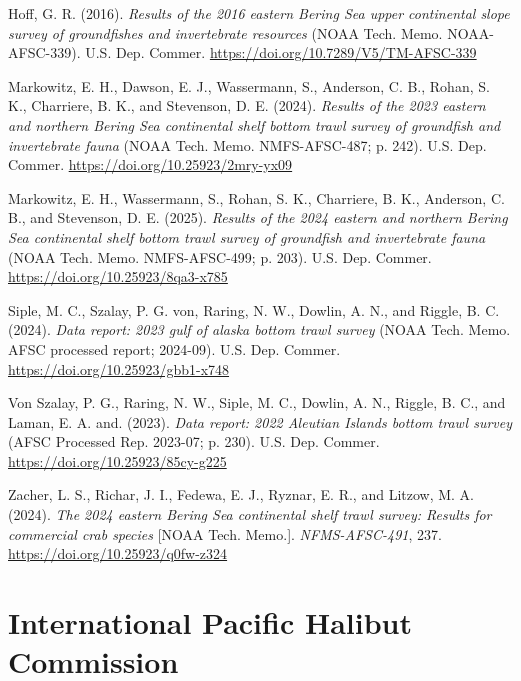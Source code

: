 \documentclass[
  letterpaper,
  oneside,
  open=any]{scrbook}
\newlength{\cslhangindent}
\newenvironment{CSLReferences}[2] %
 {\begin{list}{}{%
  \setlength{\itemindent}{0pt}
  \setlength{\leftmargin}{0pt}
  \setlength{\parsep}{0pt}
  \ifodd #1
   \setlength{\leftmargin}{\cslhangindent}
   \setlength{\itemindent}{-1\cslhangindent}
  \fi
  \setlength{\itemsep}{#2\baselineskip}}}
 {\end{list}}
\begin{document}
\label{refs}
\begin{CSLReferences}{1}{0}
Hoff, G. R. (2016). \emph{Results of the 2016 eastern {Bering Sea} upper
continental slope survey of groundfishes and invertebrate resources}
(NOAA Tech. Memo. NOAA-AFSC-339). {U.S. Dep. Commer.}
\url{https://doi.org/10.7289/V5/TM-AFSC-339}

Markowitz, E. H., Dawson, E. J., Wassermann, S., Anderson, C. B., Rohan,
S. K., Charriere, B. K., and Stevenson, D. E. (2024). \emph{Results of
the 2023 eastern and northern {Bering Sea} continental shelf bottom
trawl survey of groundfish and invertebrate fauna} (NOAA Tech. Memo.
NMFS-AFSC-487; p. 242). {U.S. Dep. Commer.}
\url{https://doi.org/10.25923/2mry-yx09}

Markowitz, E. H., Wassermann, S., Rohan, S. K., Charriere, B. K.,
Anderson, C. B., and Stevenson, D. E. (2025). \emph{Results of the 2024
eastern and northern {Bering Sea} continental shelf bottom trawl survey
of groundfish and invertebrate fauna} (NOAA Tech. Memo. NMFS-AFSC-499;
p. 203). {U.S. Dep. Commer.} \url{https://doi.org/10.25923/8qa3-x785}

Siple, M. C., Szalay, P. G. von, Raring, N. W., Dowlin, A. N., and
Riggle, B. C. (2024). \emph{Data report: 2023 gulf of alaska bottom
trawl survey} (NOAA Tech. Memo. AFSC processed report; 2024-09). {U.S.
Dep. Commer.} \url{https://doi.org/10.25923/gbb1-x748}

Von Szalay, P. G., Raring, N. W., Siple, M. C., Dowlin, A. N., Riggle,
B. C., and Laman, E. A. and. (2023). \emph{Data report: 2022 {Aleutian
Islands} bottom trawl survey} (AFSC Processed Rep. 2023-07; p. 230).
{U.S. Dep. Commer.} \url{https://doi.org/10.25923/85cy-g225}

Zacher, L. S., Richar, J. I., Fedewa, E. J., Ryznar, E. R., and Litzow,
M. A. (2024). \emph{The 2024 eastern {Bering Sea} continental shelf
trawl survey: Results for commercial crab species} {[}NOAA Tech.
Memo.{]}. \emph{NFMS-AFSC-491}, 237.
\url{https://doi.org/10.25923/q0fw-z324}

\end{CSLReferences}

\section{International Pacific Halibut
Commission}\label{international-pacific-halibut-commission}
\end{document}
